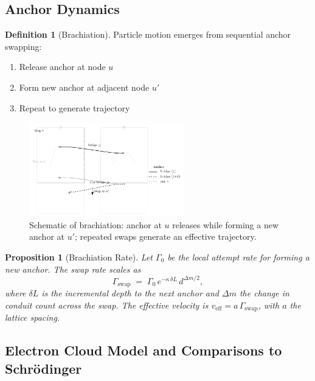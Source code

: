 \documentclass[11pt]{article}
\theoremstyle{plain}
\newtheorem{proposition}[theorem]{Proposition}
\theoremstyle{definition}
\newtheorem{definition}[theorem]{Definition}
\begin{document}
\subsection{Anchor Dynamics}
\begin{definition}[Brachiation]
  Particle motion emerges from sequential anchor swapping:
  \begin{enumerate}
    \item Release anchor at node $u$
    \item Form new anchor at adjacent node $u'$
    \item Repeat to generate trajectory
  \end{enumerate}
\end{definition}
\begin{figure}[h]
  \centering
  \includegraphics[width=0.6\textwidth]{fig_brachiation_schematic.pdf}
  \caption{Schematic of brachiation: anchor at $u$ releases while forming a new anchor at $u'$; repeated swaps generate an effective trajectory.}
  \label{fig:brachiation}
\end{figure}

\begin{proposition}[Brachiation Rate]
  Let $\Gamma_0$ be the local attempt rate for forming a new anchor. The swap rate scales as
  \begin{equation}
    \Gamma_{\mathrm{swap}} \;=\; \Gamma_0 \, e^{-\kappa\,\delta L}\, d^{\Delta m/2},
  \end{equation}
  where $\delta L$ is the incremental depth to the next anchor and $\Delta m$ the change in conduit count across the swap. The effective velocity is $v_{\mathrm{eff}} = a\,\Gamma_{\mathrm{swap}}$, with $a$ the lattice spacing.
\end{proposition}

\subsection{Electron Cloud Model and Comparisons to Schrödinger}
\label{subsec:electron-cloud}
\end{document}

